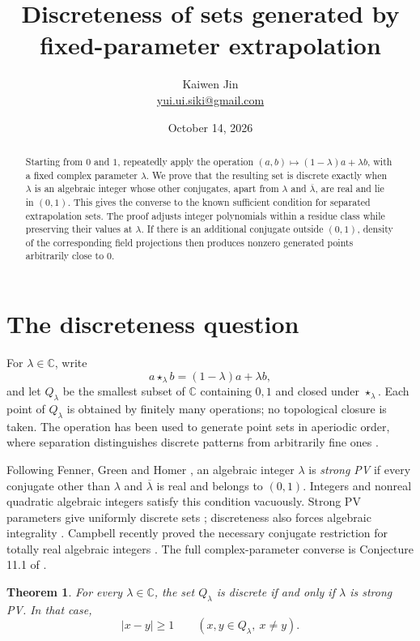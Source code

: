 \documentclass[11pt]{article}
\title{Discreteness of sets generated by fixed-parameter extrapolation}
\author{Kaiwen Jin\\\small\href{mailto:yui.ui.siki@gmail.com}{yui.ui.siki@gmail.com}}
\date{October 14, 2026}
\newtheorem{theorem}{Theorem}
\newcommand{\C}{\mathbb C}
\begin{document}
\maketitle
\begin{abstract}
Starting from $0$ and $1$, repeatedly apply the operation
$(a,b)\mapsto(1-\lambda)a+\lambda b$, with a fixed complex parameter
$\lambda$. We prove that the resulting set is discrete exactly when
$\lambda$ is an algebraic integer whose other conjugates, apart from
$\lambda$ and $\overline\lambda$, are real and lie in $(0,1)$.
This gives the converse to the known sufficient condition for separated
extrapolation sets. The proof adjusts integer polynomials within a residue
class while preserving their values at $\lambda$. If there is an additional
conjugate outside $(0,1)$, density of the corresponding field projections
then produces nonzero generated points arbitrarily close to $0$.
\end{abstract}

\section{The discreteness question}

For $\lambda\in\C$, write
\[
a\star_\lambda b=(1-\lambda)a+\lambda b,
\]
and let $Q_\lambda$ be the smallest subset of $\C$ containing $0,1$ and
closed under $\star_\lambda$. Each point of $Q_\lambda$ is obtained by
finitely many operations; no topological closure is taken. The operation
has been used to generate point sets in aperiodic order, where separation
distinguishes discrete patterns from arbitrarily fine ones
\cite{fgh-journal}.

Following Fenner, Green and Homer \cite[Definition 4.1]{fgh-journal},
an algebraic integer $\lambda$ is \emph{strong PV} if every conjugate
other than $\lambda$ and $\overline\lambda$ is real and belongs to
$(0,1)$. Integers and nonreal quadratic algebraic integers satisfy this
condition vacuously. Strong PV parameters give uniformly discrete sets
\cite[Theorem 4.12]{fgh-journal}; discreteness also forces algebraic
integrality \cite[Theorem 8.2]{fgh-extended}. Campbell recently proved
the necessary conjugate restriction for totally real algebraic integers
\cite[Theorem 2]{campbell}. The full complex-parameter converse is
Conjecture 11.1 of \cite{fgh-journal}.

\begin{theorem}\label{thm:main}
For every $\lambda\in\C$, the set $Q_\lambda$ is discrete if and only
if $\lambda$ is strong PV. In that case,
\[
 |x-y|\ge1\qquad(x,y\in Q_\lambda,\ x\ne y).
\]
\end{theorem}
\end{document}
